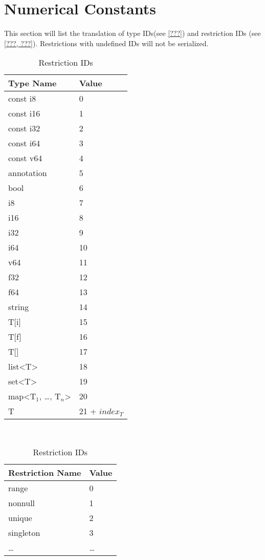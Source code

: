\documentclass[a4paper,10pt]{article}
\begin{document}
\section{Numerical Constants}
This section will list the translation of type IDs(see \ref{???}) and restriction IDs (see \ref{???, ???}). Restrictions with undefined IDs will not be serialized.

\begin{table}
\begin{subtable}[t]{5cm}
\centering
\begin{tabular}{l|l}
Type Name & Value \\\hline
const i8 	& 0 \\
const i16 	& 1 \\
const i32 	& 2 \\
const i64 	& 3 \\
const v64 	& 4 \\
annotation	& 5 \\
bool		& 6 \\
i8 		& 7 \\
i16 		& 8 \\
i32 		& 9 \\
i64 		& 10 \\
v64 		& 11 \\
f32 		& 12 \\
f64 		& 13 \\
string		& 14 \\
T[i] 		& 15 \\
T[f] 		& 16 \\
T[] 		& 17 \\
list<T> 	& 18 \\
set<T>	 	& 19 \\
map<T$_1$, \ldots, T$_n$> & 20 \\
T 		& 21 + $index_T$ \\
\end{tabular}
\caption{Type IDs}
\end{subtable}
~
\begin{subtable}[t]{5cm}
\centering
\begin{tabular}{l|l}
Restriction Name & Value \\\hline
range 	& 0 \\
nonnull 	& 1 \\
unique 	& 2 \\
singleton 	& 3 \\
\ldots 	& \ldots \\
\end{tabular}
\caption{Restriction IDs}
\end{subtable}
\end{table}


\newpage
\glsaddall
\printglossaries
\end{document}
